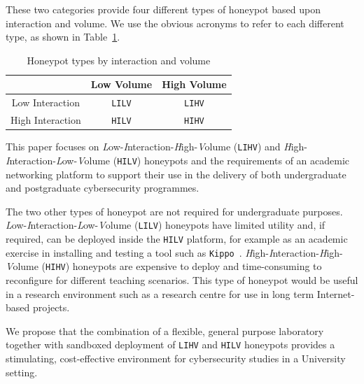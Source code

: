 \documentclass[10pt,journal]{IEEEtran}
\begin{document}
These two categories provide four different types of honeypot based upon
interaction and volume. We use the obvious acronyms to refer to each different
type, as shown in Table~\ref{table:HoneypotTypes}.

\begin{table}[h]
\caption{Honeypot types by interaction and volume\label{table:HoneypotTypes}}
\begin{center}
\begin{tabular}{| c | c| c |}
\hline
 & Low Volume & High Volume \\
\hline
Low Interaction & \texttt{LILV} & \texttt{LIHV} \\
\hline
High Interaction & \texttt{HILV} & \texttt{HIHV} \\
\hline
\end{tabular}
\end{center}
\end{table}

This paper focuses on \emph{L}ow-\-\emph{I}nteraction-\-\emph{H}igh-\-\emph{V}olume
(\texttt{LIHV}) and \emph{H}igh- \\ \emph{I}nteraction-\-\emph{L}ow-\-\emph{V}olume
(\texttt{HILV}) honeypots and the requirements of an academic networking
platform to support their use in the delivery of both undergraduate and
postgraduate cybersecurity programmes.

The two other types of honeypot are not required for undergraduate purposes.
\emph{L}ow-\emph{I}nteraction-\emph{L}ow-\emph{V}olume (\texttt{LILV})
honeypots have limited utility and, if required,  can be deployed inside the
\texttt{HILV} platform, for example as an academic exercise in installing and
testing a tool such as \texttt{Kippo}~\cite{SH:15}.
\emph{H}igh-\emph{I}nteraction-\emph{H}igh-\emph{V}olume (\texttt{HIHV})
honeypots are expensive to deploy and time-consuming to reconfigure for
different teaching scenarios. This type of honeypot would be useful in a
research environment such as a research centre for use in long term
Internet-based projects. 

We propose that the combination of a flexible, general purpose laboratory
together with sandboxed deployment of \texttt{LIHV} and \texttt{HILV} honeypots provides 
a stimulating, cost-effective environment for cybersecurity studies
in a University setting.
\end{document}
